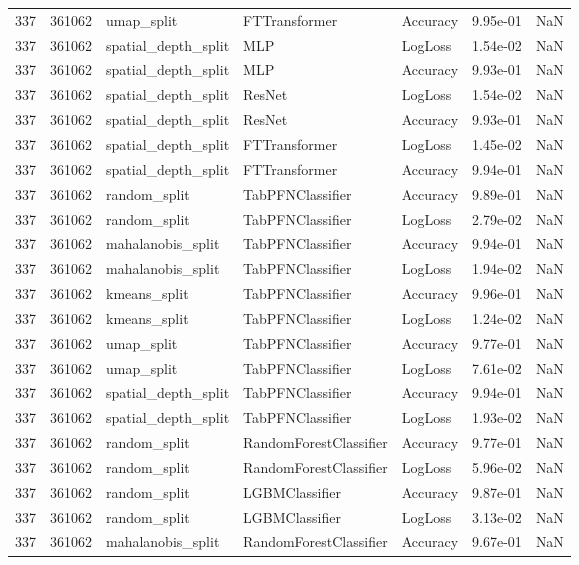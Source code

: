 \begin{tabular}{rrlllrr}
337 & 361062 & umap\_split & FTTransformer & Accuracy & 9.95e-01 & NaN \\
337 & 361062 & spatial\_depth\_split & MLP & LogLoss & 1.54e-02 & NaN \\
337 & 361062 & spatial\_depth\_split & MLP & Accuracy & 9.93e-01 & NaN \\
337 & 361062 & spatial\_depth\_split & ResNet & LogLoss & 1.54e-02 & NaN \\
337 & 361062 & spatial\_depth\_split & ResNet & Accuracy & 9.93e-01 & NaN \\
337 & 361062 & spatial\_depth\_split & FTTransformer & LogLoss & 1.45e-02 & NaN \\
337 & 361062 & spatial\_depth\_split & FTTransformer & Accuracy & 9.94e-01 & NaN \\
337 & 361062 & random\_split & TabPFNClassifier & Accuracy & 9.89e-01 & NaN \\
337 & 361062 & random\_split & TabPFNClassifier & LogLoss & 2.79e-02 & NaN \\
337 & 361062 & mahalanobis\_split & TabPFNClassifier & Accuracy & 9.94e-01 & NaN \\
337 & 361062 & mahalanobis\_split & TabPFNClassifier & LogLoss & 1.94e-02 & NaN \\
337 & 361062 & kmeans\_split & TabPFNClassifier & Accuracy & 9.96e-01 & NaN \\
337 & 361062 & kmeans\_split & TabPFNClassifier & LogLoss & 1.24e-02 & NaN \\
337 & 361062 & umap\_split & TabPFNClassifier & Accuracy & 9.77e-01 & NaN \\
337 & 361062 & umap\_split & TabPFNClassifier & LogLoss & 7.61e-02 & NaN \\
337 & 361062 & spatial\_depth\_split & TabPFNClassifier & Accuracy & 9.94e-01 & NaN \\
337 & 361062 & spatial\_depth\_split & TabPFNClassifier & LogLoss & 1.93e-02 & NaN \\
337 & 361062 & random\_split & RandomForestClassifier & Accuracy & 9.77e-01 & NaN \\
337 & 361062 & random\_split & RandomForestClassifier & LogLoss & 5.96e-02 & NaN \\
337 & 361062 & random\_split & LGBMClassifier & Accuracy & 9.87e-01 & NaN \\
337 & 361062 & random\_split & LGBMClassifier & LogLoss & 3.13e-02 & NaN \\
337 & 361062 & mahalanobis\_split & RandomForestClassifier & Accuracy & 9.67e-01 & NaN \\

\end{tabular}
